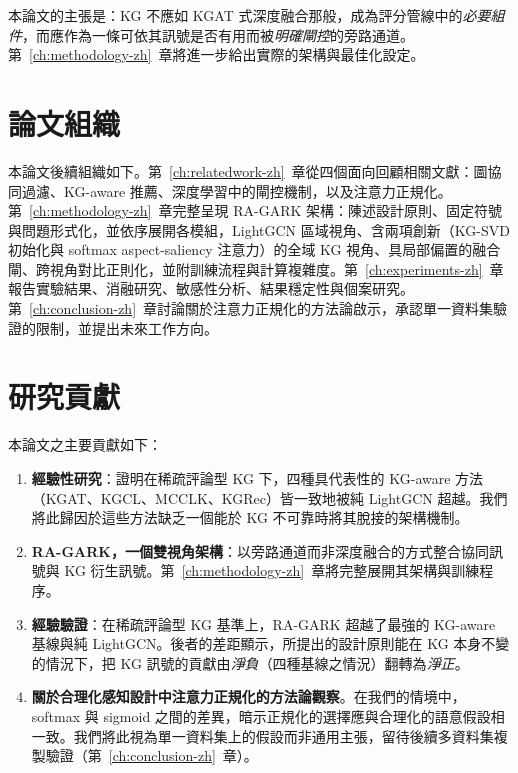 本論文的主張是：KG 不應如 KGAT 式深度融合那般，成為評分管線中的\emph{必要組件}，而應作為一條可依其訊號是否有用而被\emph{明確閘控}的旁路通道。第~\ref{ch:methodology-zh}~章將進一步給出實際的架構與最佳化設定。

\section{論文組織}
\label{sec:intro-organization-zh}

本論文後續組織如下。第~\ref{ch:relatedwork-zh}~章從四個面向回顧相關文獻：圖協同過濾、KG-aware 推薦、深度學習中的閘控機制，以及注意力正規化。第~\ref{ch:methodology-zh}~章完整呈現 RA-GARK 架構：陳述設計原則、固定符號與問題形式化，並依序展開各模組，LightGCN 區域視角、含兩項創新（KG-SVD 初始化與 softmax aspect-saliency 注意力）的全域 KG 視角、具局部偏置的融合閘、跨視角對比正則化，並附訓練流程與計算複雜度。第~\ref{ch:experiments-zh}~章報告實驗結果、消融研究、敏感性分析、結果穩定性與個案研究。第~\ref{ch:conclusion-zh}~章討論關於注意力正規化的方法論啟示，承認單一資料集驗證的限制，並提出未來工作方向。

\section{研究貢獻}
\label{sec:intro-contributions-zh}

本論文之主要貢獻如下：

\begin{enumerate}
  \item \textbf{經驗性研究}：證明在稀疏評論型 KG 下，四種具代表性的 KG-aware 方法（KGAT、KGCL、MCCLK、KGRec）皆一致地被純 LightGCN 超越。我們將此歸因於這些方法缺乏一個能於 KG 不可靠時將其脫接的架構機制。

  \item \textbf{RA-GARK，一個雙視角架構}：以旁路通道而非深度融合的方式整合協同訊號與 KG 衍生訊號。第~\ref{ch:methodology-zh}~章將完整展開其架構與訓練程序。

  \item \textbf{經驗驗證}：在稀疏評論型 KG 基準上，RA-GARK 超越了最強的 KG-aware 基線與純 LightGCN。後者的差距顯示，所提出的設計原則能在 KG 本身不變的情況下，把 KG 訊號的貢獻由\emph{淨負}（四種基線之情況）翻轉為\emph{淨正}。

  \item \textbf{關於合理化感知設計中注意力正規化的方法論觀察}。在我們的情境中，softmax 與 sigmoid 之間的差異，暗示正規化的選擇應與合理化的語意假設相一致。我們將此視為單一資料集上的假設而非通用主張，留待後續多資料集複製驗證（第~\ref{ch:conclusion-zh}~章）。
\end{enumerate}
